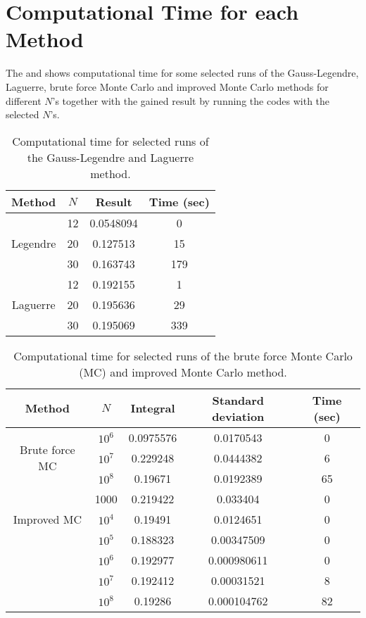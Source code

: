 \section{Computational Time for each Method}
\label{sec:ComputationalTime}
The  and  shows computational time for some selected runs of the Gauss-Legendre, Laguerre, brute force Monte Carlo and improved Monte Carlo methods for different $N$'s together with the gained result by running the codes with the selected $N$'s. 

\begin{table}[ht]
\centering
\caption{Computational time for selected runs of the Gauss-Legendre and Laguerre method.}
\begin{center}
\begin{tabular}{|c|c|c|c|}
    \hline
    Method & $N$ & Result & Time (sec)
    \\
    \hline
    \multirow{3}{*}{Legendre}
    & 12 & 0.0548094  &  0 
    \\
    & 20 & 0.127513 & 15
    \\
    & 30 & 0.163743 & 179
    \\
    \hline
    \multirow{3}{*}{Laguerre}
    & 12 & 0.192155 &  1
    \\
    & 20 & 0.195636 & 29
    \\
    & 30 & 0.195069 & 339
    \\
    \hline
\end{tabular}
\end{center}
\label{tab:multicol}
\end{table}

\begin{table}[ht]
\centering
\caption{Computational time for selected runs of the brute force Monte Carlo (MC) and improved Monte Carlo method.}
\begin{center}
\begin{tabular}{|c|c|c|c|c|}
	\hline
    Method & $N$ & Integral & Standard deviation & Time (sec)
    \\    
    \hline
    \multirow{3}{*}{Brute force MC}
    & $10^6$ & 0.0975576 & 0.0170543 & 0
    \\
    & $10^7$ & 0.229248 & 0.0444382 & 6
    \\
    & $10^8$ & 0.19671 & 0.0192389 & 65 
    \\
    \hline
	\multirow{3}{*}{Improved MC}
	& 1000 & 0.219422 & 0.033404 & 0  
    \\
    & $10^4$ & 0.19491 & 0.0124651 & 0
    \\
    & $10^5$ & 0.188323 & 0.00347509 & 0
    \\
    & $10^6$ & 0.192977 & 0.000980611 & 0
    \\
    & $10^7$ & 0.192412 & 0.00031521 & 8
    \\
    & $10^8$ & 0.19286 & 0.000104762 & 82
    \\
    \hline
\end{tabular}
\end{center}
\label{tab:multicol2}
\end{table}

